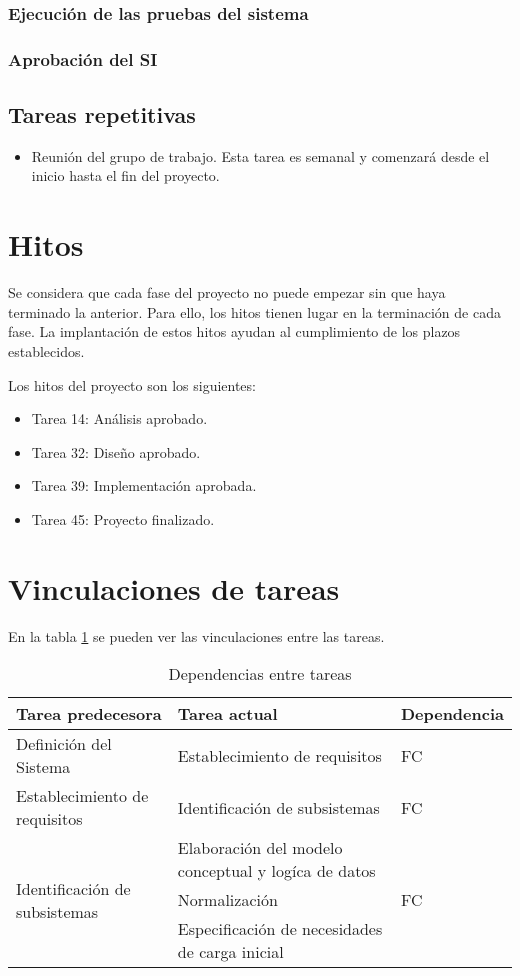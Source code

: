 \documentclass[11pt,a4paper,spanish,twoside]{book}
\begin{document}
\subsubsection{Ejecución de las pruebas del sistema}
\subsubsection{Aprobación del SI}

\subsection{Tareas repetitivas}
  \begin{itemize}
  \item Reunión del grupo de trabajo. Esta tarea es semanal y comenzará desde
    el inicio hasta el fin del proyecto.
  \end{itemize}
\section{Hitos}
Se considera que cada fase del proyecto no puede empezar sin que haya
terminado la anterior. Para ello, los hitos tienen lugar en la terminación de
cada fase. La implantación de estos hitos ayudan al cumplimiento de los
plazos establecidos.

Los hitos del proyecto son los siguientes:
\begin{itemize}
\item Tarea 14: Análisis aprobado.
\item Tarea 32: Diseño aprobado.
\item Tarea 39: Implementación aprobada.
\item Tarea 45: Proyecto finalizado.
\end{itemize}

\section{Vinculaciones de tareas}
En la tabla \ref{Tab:Dep} se pueden ver las vinculaciones entre las tareas.
\begin{table}[!h]
  \centering
  \small
  \begin{tabular}{l|p{5cm}|l}
    \textbf{Tarea predecesora} & \textbf{Tarea actual} & \textbf{Dependencia}\\
    \hline
    Definición del Sistema & Establecimiento de requisitos & FC \\
    \hline
    Establecimiento de requisitos & Identificación de subsistemas & FC \\
    \hline
    \multirow{3}{*}{Identificación de subsistemas} & Elaboración del modelo 
conceptual y logíca de datos & \multirow{3}{*}{FC} \\
    & Normalización \\
    & Especificación de necesidades de carga inicial \\
    
  \end{tabular}
  \caption{Dependencias entre tareas} \label{Tab:Dep}
\end{table}
\end{document}
